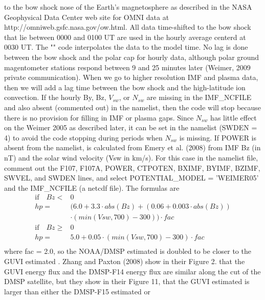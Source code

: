 to the bow shock nose of the Earth's magnetosphere as described in the
NASA Geophysical Data Center web site for OMNI data at
http://omniweb.gsfc.nasa.gov/ow.html.  All data time-shifted to the bow
shock that lie between 0000 and 0100 UT are used in the hourly average
centerd at 0030 UT.  The "" code interpolates the data
to the model time.  No lag is done between the bow shock and the polar
cap for hourly data, although polar ground magentometer stations respond
between 9 and 25 minutes later (Weimer, 2009 private communication).
When we go to higher resolution IMF and plasma data, then we will add a
lag time between the bow shock and the high-latitude ion convection.
%
If the hourly By, Bz, $V_{sw}$, or $N_{sw}$ are missing in the IMF\_NCFILE and
also absent (commented out) in the namelist, then the code will stop
because there is no provision for filling in IMF or plasma gaps.
Since $N_{sw}$ has little effect on the Weimer 2005  as described later,
it can be set in the namelist (SWDEN = 4) to avoid the code stopping during
periods when $N_{sw}$ is missing.
%
If POWER is absent from the namelist,  is calculated from
Emery et al. (2008) \cite{Emery2008} from IMF Bz (in nT) and the solar wind
velocity (Vsw in km/s).  For this case
in the namelist file, comment out the F107, F107A, POWER, CTPOTEN, BXIMF, BYIMF,
BZIMF, SWVEL, and SWDEN
lines, and select POTENTIAL\_MODEL = 'WEIMER05' and the IMF\_NCFILE (a netcdf file).
The formulas are
 \cite{Emery2008}
%
\begin{equation}
  \begin{split}
      \text{if} \quad Bz <& 0 \\
		     hp =& (6.0 + 3.3 \cdot abs(Bz) + (0.06 + 0.003 \cdot abs(Bz)) \\
		       {}& \cdot  (min(Vsw,700) - 300)) \cdot fac \\
      \text{if} \quad Bz \geq&  0 \\
		     hp =& {5.0 + 0.05 \cdot (min(Vsw,700) - 300)} \cdot fac \\
   \end{split}
    \label{eq:maginp_3}
\end{equation}
where fac = 2.0, so the NOAA/DMSP estimated  is doubled to
be closer to the GUVI estimated .  Zhang and Paxton (2008)
\cite{zhang2008} show in their Figure 2. that the GUVI energy flux
and the DMSP-F14 energy flux are similar along the cut of the DMSP
satellite, but they show in their Figure 11, that the GUVI estimated
 is larger than either the DMSP-F15 estimated  or
